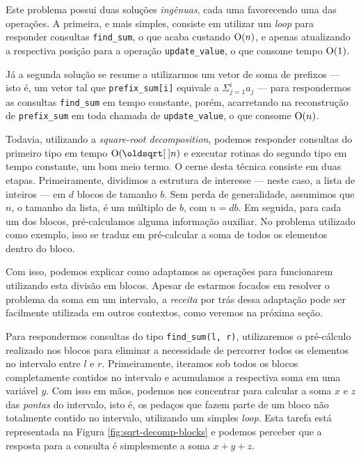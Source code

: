Este problema possui duas soluções \emph{ingênuas}, cada uma favorecendo uma das operações. A primeira, e mais simples, consiste em utilizar um \emph{loop} para responder consultas \texttt{find\_sum}, o que acaba custando $\mathrm{O}(n)$, e apenas atualizando a respectiva posição para a operação \texttt{update\_value}, o que consome tempo $\mathrm{O}(1)$.

Já a segunda solução se resume a utilizarmos um vetor de soma de prefixos --- isto é, um vetor tal que \texttt{prefix\_sum[i]} equivale a $\Sigma_{j=1}^{i} a_j$ --- para respondermos as consultas \texttt{find\_sum} em tempo constante, porém, acarretando na reconstrução de \texttt{prefix\_sum} em toda chamada de \texttt{update\_value}, o que consome $\mathrm{O}(n)$.

Todavia, utilizando a \emph{square-root decomposition}, podemos responder consultas do primeiro tipo em tempo $\Oh(\sqrt{n})$ e executar rotinas do segundo tipo em tempo constante, um bom meio termo. O cerne desta técnica consiste em duas etapas. Primeiramente, dividimos a estrutura de interesse --- neste caso, a lista de inteiros --- em $d$ blocos de tamanho $b$. Sem perda de generalidade, assumimos que $n$, o tamanho da lista, é um múltiplo de $b$, com $n = db$. Em seguida, para cada um dos blocos, pré-calculamos alguma informação auxiliar. No problema utilizado como exemplo, isso se traduz em pré-calcular a soma de todos os elementos dentro do bloco.

Com isso, podemos explicar como adaptamos as operações para funcionarem utilizando esta divisão em blocos. Apesar de estarmos focados em resolver o problema da soma em um intervalo, a \emph{receita} por trás dessa adaptação pode ser facilmente utilizada em outros contextos, como veremos na próxima seção.

Para respondermos consultas do tipo \texttt{find\_sum(l, r)}, utilizaremos o pré-cálculo realizado nos blocos para eliminar a necessidade de percorrer todos os elementos no intervalo entre $l$ e $r$. Primeiramente, iteramos sob todos os blocos completamente contidos no intervalo e acumulamos a respectiva soma em uma variável $y$. Com isso em mãos, podemos nos concentrar para calcular a soma $x$ e $z$ das \emph{pontas} do intervalo, isto é, os pedaços que fazem parte de um bloco não totalmente contido no intervalo, utilizando um simples \emph{loop}. Esta tarefa está representada na Figura \ref{fig:sqrt-decomp-blocks} e podemos perceber que a resposta para a consulta é simplesmente a soma $x + y + z$.

